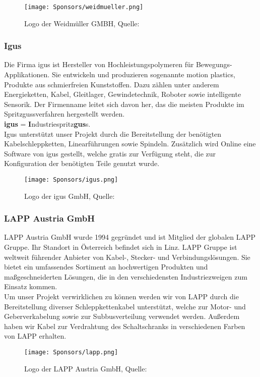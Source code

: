 \begin{figure}[H]
    \centering
    \texttt{[image: Sponsors/weidmueller.png]}
    \caption{Logo der Weidmüller GMBH, Quelle: \cite{weidmueller_logo}}
    \label{fig:weidmueller_logo}
\end{figure}

\subsubsection{Igus}
Die Firma igus ist Hersteller von Hochleistungspolymeren für Bewegungs-Applikationen. Sie entwickeln und produzieren sogenannte motion plastics, Produkte aus schmierfreien Kunststoffen. Dazu zählen unter anderem Energieketten, Kabel, Gleitlager, Gewindetechnik, Roboter sowie intelligente Sensorik. Der Firmenname leitet sich davon her, das die meisten Produkte im Spritzgussverfahren hergestellt werden.\\
\textbf{igus} = \textbf{I}ndustriespritz\textbf{gus}s. \cite{igus} \\
Igus unterstützt unser Projekt durch die Bereitstellung der benötigten Kabelschleppketten, Linearführungen sowie Spindeln. Zusätzlich wird Online eine Software von igus gestellt, welche gratis zur Verfügung steht, die zur Konfiguration der benötigten Teile genutzt wurde.

\begin{figure}[H]
    \centering
    \texttt{[image: Sponsors/igus.png]}
    \caption{Logo der igus GmbH,  Quelle: \cite{igus_logo}}
    \label{fig:igus_logo}
\end{figure}

\subsubsection{LAPP Austria GmbH}
LAPP Austria GmbH wurde 1994 gegründet und ist Mitglied der globalen LAPP Gruppe. Ihr Standort in Österreich befindet sich in Linz. LAPP Gruppe ist weltweit führender Anbieter von Kabel-, Stecker- und Verbindungslösungen. Sie bietet ein umfassendes Sortiment an hochwertigen Produkten und maßgeschneiderten Lösungen, die in den verschiedensten Industriezweigen zum Einsatz kommen.\cite{lapp}\\
Um unser Projekt verwirklichen zu können werden wir von LAPP durch die Bereitstellung diverser Schleppkettenkabel unterstützt, welche zur Motor- und Geberverkabelung sowie zur Subbusverteilung verwendet werden. Außerdem haben wir Kabel zur Verdrahtung des Schaltschranks in verschiedenen Farben von LAPP erhalten.
\begin{figure}[H]
    \centering
    \vspace{5mm}
    \texttt{[image: Sponsors/lapp.png]}
    \caption{Logo der LAPP Austria GmbH, Quelle: \cite{lapp_logo}}
    \label{fig:lapp_logo}
\end{figure}

